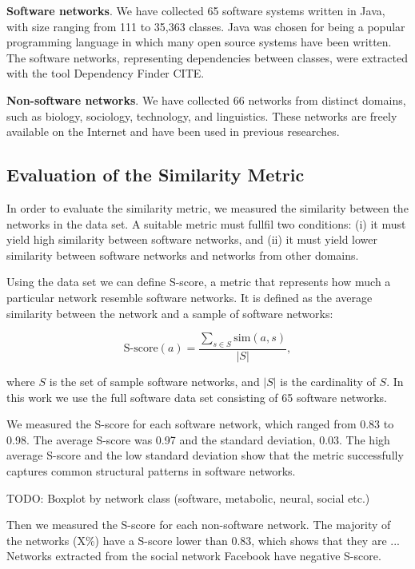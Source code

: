 \textbf{Software networks}. We have collected 65 software systems written in
Java, with size ranging from 111 to 35,363 classes. Java was chosen for being a
popular programming language in which many open source systems have been
written. The software networks, representing dependencies between classes, were
extracted with the tool Dependency Finder CITE.

\textbf{Non-software networks}. We have collected 66 networks from distinct
domains, such as biology, sociology, technology, and linguistics. These networks
are freely available on the Internet and have been used in previous researches.


\subsection{Evaluation of the Similarity Metric}

In order to evaluate the similarity metric, we measured the similarity between
the networks in the data set. A suitable metric must fullfil two conditions: (i)
it must yield high similarity between software networks, and (ii) it must yield
lower similarity between software networks and networks from other domains.

Using the data set we can define S-score, a metric that represents how much a
particular network resemble software networks. It is defined as the average
similarity between the network and a sample of software networks:

$$
\mathrm{S\mbox{-}score}(a) = \frac{
\sum_{s \in S} \mathrm{sim}(a, s)
}{|S|} \mathrm{,}
$$

where $S$ is the set of sample software networks, and $|S|$ is the cardinality
of $S$. In this work we use the full software data set consisting of 65 software
networks.

We measured the S-score for each software network, which ranged from 0.83 to
0.98. The average S-score was 0.97 and the standard deviation, 0.03. The high
average S-score and the low standard deviation show that the metric successfully
captures common structural patterns in software networks.

TODO: Boxplot by network class (software, metabolic, neural, social etc.)

Then we measured the S-score for each non-software network. The majority of the
networks (X\%) have a S-score lower than 0.83, which shows that they
are ... Networks extracted from the social network Facebook have negative
S-score.

